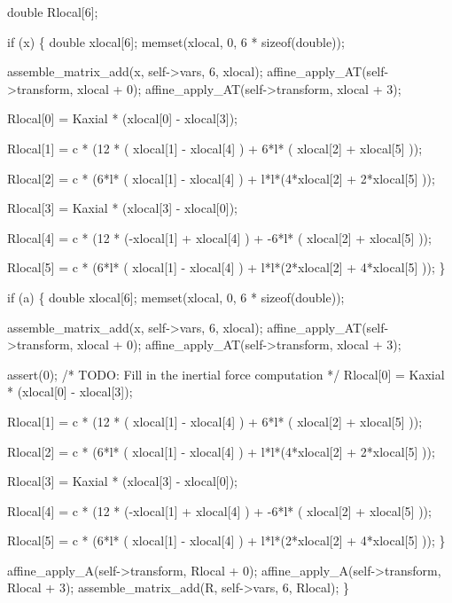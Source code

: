     double Rlocal[6];

    if (x) \{
        double xlocal[6];
        memset(xlocal, 0, 6 * sizeof(double));

        assemble_matrix_add(x, self->vars, 6, xlocal);
        affine_apply_AT(self->transform, xlocal + 0);
        affine_apply_AT(self->transform, xlocal + 3);

        Rlocal[0] = Kaxial * (xlocal[0] - xlocal[3]);
        
        Rlocal[1] = c * (12 * ( xlocal[1] - xlocal[4] ) + 
                         6*l* ( xlocal[2] + xlocal[5] ));

        Rlocal[2] = c * (6*l* ( xlocal[1] - xlocal[4] ) +
                         l*l*(4*xlocal[2] + 2*xlocal[5] ));


        Rlocal[3] = Kaxial * (xlocal[3] - xlocal[0]);

        Rlocal[4] = c * (12 *  (-xlocal[1] + xlocal[4] ) + 
                         -6*l* ( xlocal[2] + xlocal[5] ));

        Rlocal[5] = c * (6*l* ( xlocal[1] - xlocal[4] ) +
                         l*l*(2*xlocal[2] + 4*xlocal[5] ));
    \}

    if (a) \{
        double xlocal[6];
        memset(xlocal, 0, 6 * sizeof(double));

        assemble_matrix_add(x, self->vars, 6, xlocal);
        affine_apply_AT(self->transform, xlocal + 0);
        affine_apply_AT(self->transform, xlocal + 3);

        assert(0);
        /* TODO: Fill in the inertial force computation */
        Rlocal[0] = Kaxial * (xlocal[0] - xlocal[3]);
        
        Rlocal[1] = c * (12 * ( xlocal[1] - xlocal[4] ) + 
                         6*l* ( xlocal[2] + xlocal[5] ));

        Rlocal[2] = c * (6*l* ( xlocal[1] - xlocal[4] ) +
                         l*l*(4*xlocal[2] + 2*xlocal[5] ));


        Rlocal[3] = Kaxial * (xlocal[3] - xlocal[0]);

        Rlocal[4] = c * (12 *  (-xlocal[1] + xlocal[4] ) + 
                         -6*l* ( xlocal[2] + xlocal[5] ));

        Rlocal[5] = c * (6*l* ( xlocal[1] - xlocal[4] ) +
                         l*l*(2*xlocal[2] + 4*xlocal[5] ));
    \}

    affine_apply_A(self->transform, Rlocal + 0);
    affine_apply_A(self->transform, Rlocal + 3);
    assemble_matrix_add(R, self->vars, 6, Rlocal);
\}


